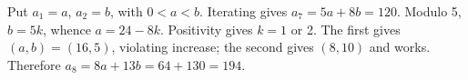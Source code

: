Put $a_1=a$, $a_2=b$, with $0<a<b$. Iterating gives $a_7=5a+8b=120$. Modulo 5, $b=5k$, whence $a=24-8k$. Positivity gives $k=1$ or 2. The first gives $(a,b)=(16,5)$, violating increase; the second gives $(8,10)$ and works. Therefore $a_8=8a+13b=64+130=\boxed{194}$.
